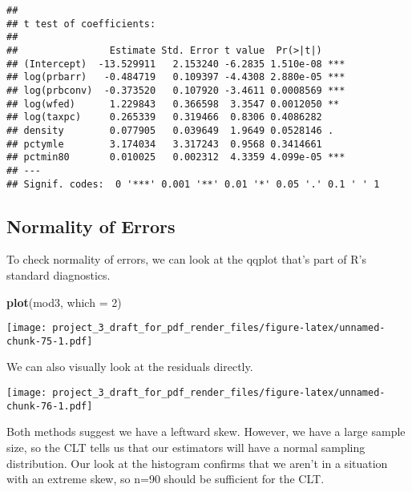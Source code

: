 \documentclass[]{article}
\newenvironment{Shaded}{\begin{snugshade}}{\end{snugshade}}
\newcommand{\DataTypeTok}[1]{\textcolor[rgb]{0.13,0.29,0.53}{#1}}
\newcommand{\DecValTok}[1]{\textcolor[rgb]{0.00,0.00,0.81}{#1}}
\newcommand{\KeywordTok}[1]{\textcolor[rgb]{0.13,0.29,0.53}{\textbf{#1}}}
\newcommand{\NormalTok}[1]{#1}
\newcommand{\OperatorTok}[1]{\textcolor[rgb]{0.81,0.36,0.00}{\textbf{#1}}}
\newcommand{\StringTok}[1]{\textcolor[rgb]{0.31,0.60,0.02}{#1}}
\begin{document}
\begin{verbatim}
## 
## t test of coefficients:
## 
##                Estimate Std. Error t value  Pr(>|t|)    
## (Intercept)  -13.529911   2.153240 -6.2835 1.510e-08 ***
## log(prbarr)   -0.484719   0.109397 -4.4308 2.880e-05 ***
## log(prbconv)  -0.373520   0.107920 -3.4611 0.0008569 ***
## log(wfed)      1.229843   0.366598  3.3547 0.0012050 ** 
## log(taxpc)     0.265339   0.319466  0.8306 0.4086282    
## density        0.077905   0.039649  1.9649 0.0528146 .  
## pctymle        3.174034   3.317243  0.9568 0.3414661    
## pctmin80       0.010025   0.002312  4.3359 4.099e-05 ***
## ---
## Signif. codes:  0 '***' 0.001 '**' 0.01 '*' 0.05 '.' 0.1 ' ' 1
\end{verbatim}

\hypertarget{normality-of-errors}{%
\subsection{Normality of Errors}\label{normality-of-errors}}

To check normality of errors, we can look at the qqplot that's part of
R's standard diagnostics.

\begin{Shaded}
\begin{Highlighting}[]
\KeywordTok{plot}\NormalTok{(mod3, }\DataTypeTok{which =} \DecValTok{2}\NormalTok{)}
\end{Highlighting}
\end{Shaded}

\texttt{[image: project\_3\_draft\_for\_pdf\_render\_files/figure-latex/unnamed-chunk-75-1.pdf]}

We can also visually look at the residuals directly.

\begin{Shaded}
\end{Shaded}

\texttt{[image: project\_3\_draft\_for\_pdf\_render\_files/figure-latex/unnamed-chunk-76-1.pdf]}

Both methods suggest we have a leftward skew. However, we have a large
sample size, so the CLT tells us that our estimators will have a normal
sampling distribution. Our look at the histogram confirms that we aren't
in a situation with an extreme skew, so n=90 should be sufficient for
the CLT.
\end{document}
